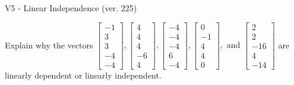 \begin{exercise}
  \begin{exerciseTitle}V5 - Linear Independence (ver. 225)\end{exerciseTitle}
  \begin{exerciseStatement}
    Explain why the vectors \(\left[\begin{array}{r}
-1 \\
3 \\
3 \\
-4 \\
-4
\end{array}\right] , \left[\begin{array}{r}
4 \\
4 \\
4 \\
-6 \\
4
\end{array}\right] , \left[\begin{array}{r}
-4 \\
-4 \\
-4 \\
6 \\
-4
\end{array}\right] , \left[\begin{array}{r}
0 \\
-1 \\
4 \\
4 \\
0
\end{array}\right] , \text{ and } \left[\begin{array}{r}
2 \\
2 \\
-16 \\
4 \\
-14
\end{array}\right]\) are linearly dependent or linearly independent.	



\end{exerciseStatement}
\end{exercise}
